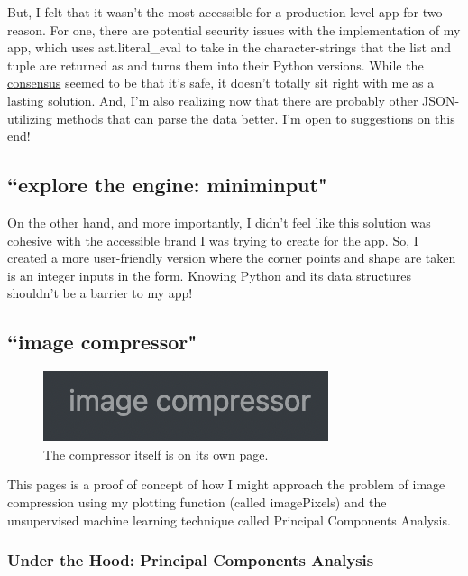 \documentclass[10pt]{article}
\begin{document}
\begin{multicols*}{2}
But, I felt that it wasn't the most accessible for a production-level app for two reason. For one, there are potential security issues with the implementation of my app, which uses ast.literal\_eval to take in the character-strings that the list and tuple are returned as and turns them into their Python versions. While the \href{https://stackoverflow.com/questions/4710247/python-3-are-there-any-known-security-holes-in-ast-literal-evalnode-or-string#:~:text=The\%20documentation\%20states\%20it\%20is,if\%20it\%20is\%20a\%20literal.}{consensus} seemed to be that it's safe, it doesn't totally sit right with me as a lasting solution. And, I'm also realizing now that there are probably other JSON-utilizing methods that can parse the data better. I'm open to suggestions on this end!

\subsection{``explore the engine: miniminput"}

On the other hand, and more importantly, I didn't feel like this solution was cohesive with the accessible brand I was trying to create for the app. So, I created a more user-friendly version where the corner points and shape are taken is an integer inputs in the form. Knowing Python and its data structures shouldn't be a barrier to my app! 

\subsection{``image compressor"}

\begin{figure}[H]
    \centering
	\includegraphics[width=.5\columnwidth]{ic.png}
	\caption{The compressor itself is on its own page.}
	\label{fig:fig5}
\end{figure}

This pages is a proof of concept of how I might approach the problem of image compression using my plotting function (called imagePixels) and the unsupervised machine learning technique called Principal Components Analysis.

\subsubsection{Under the Hood: Principal Components Analysis}


\end{multicols*}
\end{document}
